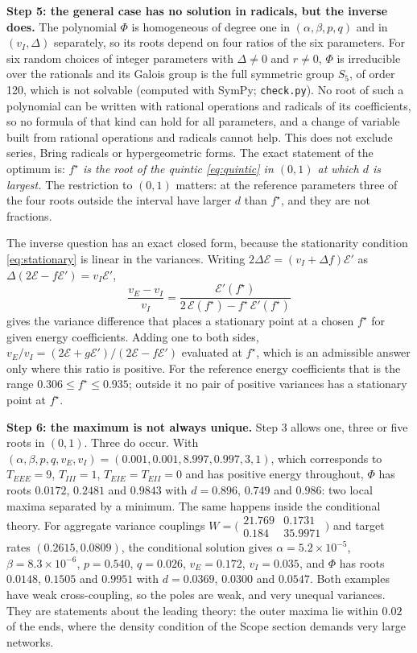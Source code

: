 \documentclass[11pt]{article}
\newcommand{\energy}{\mathcal E}
\begin{document}
\textbf{Step 5: the general case has no solution in radicals, but the inverse does.} The polynomial $\Phi$ is homogeneous of degree one in $(\alpha,\beta,p,q)$ and in $(v_I,\Delta)$ separately, so its roots depend on four ratios of the six parameters. For six random choices of integer parameters with $\Delta\ne0$ and $r\ne0$, $\Phi$ is irreducible over the rationals and its Galois group is the full symmetric group $S_5$, of order 120, which is not solvable (computed with SymPy; \texttt{check.py}). No root of such a polynomial can be written with rational operations and radicals of its coefficients, so no formula of that kind can hold for all parameters, and a change of variable built from rational operations and radicals cannot help. This does not exclude series, Bring radicals or hypergeometric forms. The exact statement of the optimum is: \emph{$f^\star$ is the root of the quintic \eqref{eq:quintic} in $(0,1)$ at which $d$ is largest.} The restriction to $(0,1)$ matters: at the reference parameters three of the four roots outside the interval have larger $d$ than $f^\star$, and they are not fractions.

The inverse question has an exact closed form, because the stationarity condition \eqref{eq:stationary} is linear in the variances. Writing $2\Delta\energy=(v_I+\Delta f)\energy'$ as $\Delta(2\energy-f\energy')=v_I\energy'$,
\begin{equation}
 \boxed{\;\frac{v_E-v_I}{v_I}=\frac{\energy'(f^\star)}{2\,\energy(f^\star)-f^\star\,\energy'(f^\star)}\;}
 \label{eq:inverse}
\end{equation}
gives the variance difference that places a stationary point at a chosen $f^\star$ for given energy coefficients. Adding one to both sides, $v_E/v_I=(2\energy+g\energy')/(2\energy-f\energy')$ evaluated at $f^\star$, which is an admissible answer only where this ratio is positive. For the reference energy coefficients that is the range $0.306\le f^\star\le0.935$; outside it no pair of positive variances has a stationary point at $f^\star$.

\textbf{Step 6: the maximum is not always unique.} Step 3 allows one, three or five roots in $(0,1)$. Three do occur. With $(\alpha,\beta,p,q,v_E,v_I)=(0.001,0.001,8.997,0.997,3,1)$, which corresponds to $T_{EEE}=9$, $T_{III}=1$, $T_{EIE}=T_{EII}=0$ and has positive energy throughout, $\Phi$ has roots $0.0172$, $0.2481$ and $0.9843$ with $d=0.896$, $0.749$ and $0.986$: two local maxima separated by a minimum. The same happens inside the conditional theory. For aggregate variance couplings $W=\bigl(\begin{smallmatrix}21.769&0.1731\\0.184&35.9971\end{smallmatrix}\bigr)$ and target rates $(0.2615,0.0809)$, the conditional solution gives $\alpha=5.2\times10^{-5}$, $\beta=8.3\times10^{-6}$, $p=0.540$, $q=0.026$, $v_E=0.172$, $v_I=0.035$, and $\Phi$ has roots $0.0148$, $0.1505$ and $0.9951$ with $d=0.0369$, $0.0300$ and $0.0547$. Both examples have weak cross-coupling, so the poles are weak, and very unequal variances. They are statements about the leading theory: the outer maxima lie within $0.02$ of the ends, where the density condition of the Scope section demands very large networks.
\end{document}
